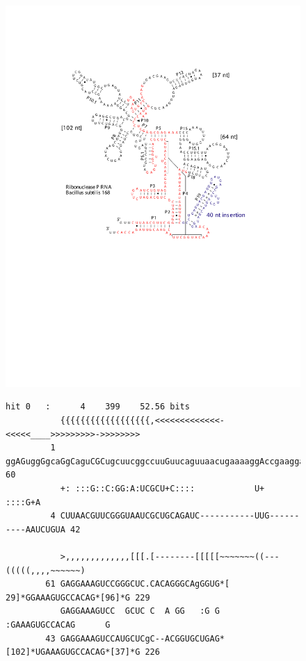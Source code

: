 \begin{figure}[tp]
\begin{center}
\includegraphics[scale=0.6]{figures/rnaseP-bsu-alignment}
\end{center}
\begin{center}
{\scriptsize
\begin{BVerbatim}
hit 0   :      4    399    52.56 bits
           {{{{{{{{{{{{{{{{{{,<<<<<<<<<<<<<-<<<<<____>>>>>>>>>->>>>>>>>
         1 ggAGuggGgcaGgCaguCGCugcuucggccuuGuucaguuaacugaaaaggAccgaagga 60
           +: :::G::C:GG:A:UCGCU+C::::            U+            ::::G+A
         4 CUUAACGUUCGGGUAAUCGCUGCAGAUC-----------UUG----------AAUCUGUA 42

           >,,,,,,,,,,,,,[[[.[--------[[[[[~~~~~~~((---(((((,,,,~~~~~~)
        61 GAGGAAAGUCCGGGCUC.CACAGGGCAgGGUG*[ 29]*GGAAAGUGCCACAG*[96]*G 229
           GAGGAAAGUCC  GCUC C  A GG   :G G       :GAAAGUGCCACAG      G
        43 GAGGAAAGUCCAUGCUCgC--ACGGUGCUGAG*[102]*UGAAAGUGCCACAG*[37]*G 226


\end{BVerbatim}}
\end{center}
\end{figure}
